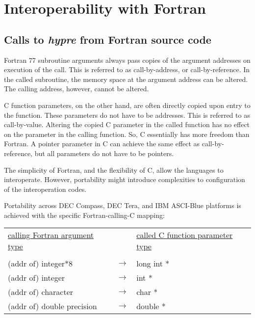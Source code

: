 \chapter{Interoperability with Fortran}

\section{Calls to {\itshape hypre} from Fortran source code}

Fortran 77 subroutine arguments always pass copies of the argument addresses
on execution of the call.  This is referred to as call-by-address, or
call-by-reference.  In the called subroutine, the memory space at the
argument address can be altered.  The calling address, however, cannot be
altered.

C function parameters, on the other hand, are often directly copied upon
entry to the function.  These parameters do not have to be addresses.
This is referred to as call-by-value.  Altering the copied C parameter in the
called function has no effect on the parameter in the calling function.  So,
C essentially has more freedom than Fortran.  A pointer parameter in C can
achieve the same effect as call-by-reference, but all parameters do not have
to be pointers.

The simplicity of Fortran, and the flexibility of C, allow the languages to
interoperate.  However, portability might introduce complexities to
configuration of the interoperation codes.

Portability across DEC Compass, DEC Tera, and IBM ASCI-Blue platforms is
achieved with the specific Fortran-calling-C mapping: 

\vspace{0.1in}

\begin{tabular}{lcl}

\underline{calling Fortran argument type} & &
\underline{called C function parameter type} \\
                              &                   &   \\
\hspace{0.1in} (addr of) integer*8        & $\longrightarrow$ &
\hspace{0.1in} long int * \\
\hspace{0.1in} (addr of) integer          & $\longrightarrow$ &
\hspace{0.1in} int * \\
\hspace{0.1in} (addr of) character        & $\longrightarrow$ &
\hspace{0.1in} char * \\
\hspace{0.1in} (addr of) double precision & $\longrightarrow$ &
\hspace{0.1in} double * \\

\end{tabular}

